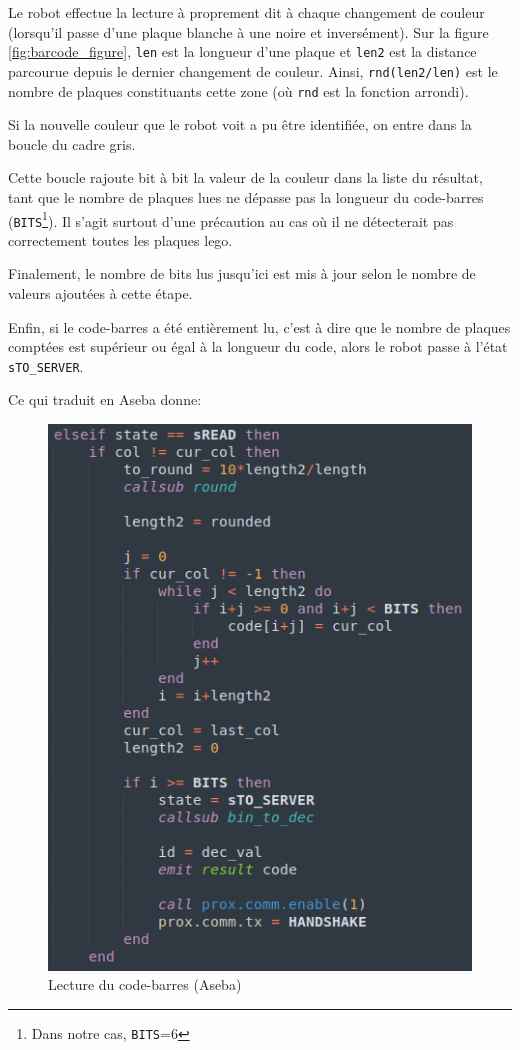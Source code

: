 Le robot effectue la lecture à proprement dit à chaque changement de couleur (lorsqu'il passe d'une plaque blanche à une noire et inversément). Sur la figure \ref{fig:barcode_figure}, \texttt{len} est la longueur d'une plaque et \texttt{len2} est la distance parcourue depuis le dernier changement de couleur. Ainsi, \texttt{rnd(len2/len)} est le nombre de plaques constituants cette zone (où \texttt{rnd} est la fonction arrondi).

Si la nouvelle couleur que le robot voit a pu être identifiée, on entre dans la boucle du cadre gris.

Cette boucle rajoute bit à bit la valeur de la couleur dans la liste du résultat, tant que le nombre de plaques lues ne dépasse pas la longueur du code-barres (\texttt{BITS}\footnote{Dans notre cas, \texttt{BITS}=6}). Il s'agit surtout d'une précaution au cas où il ne détecterait pas correctement toutes les plaques lego.

Finalement, le nombre de bits lus jusqu'ici est mis à jour selon le nombre de valeurs ajoutées à cette étape.

Enfin, si le code-barres a été entièrement lu, c'est à dire que le nombre de plaques comptées est supérieur ou égal à la longueur du code, alors le robot passe à l'état \texttt{sTO\_SERVER}.

Ce qui traduit en Aseba donne:
\begin{figure}[H]
  \centering
  \includegraphics[width=0.7\linewidth]{code/client_barcode_reading}
  \caption{Lecture du code-barres (Aseba)}
  \label{fig:client_barcode_reading}
\end{figure}

